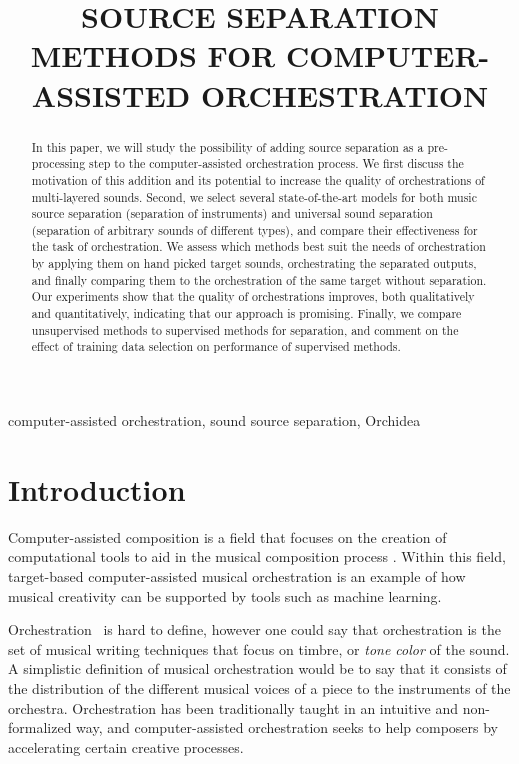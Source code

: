 \documentclass{article}
\title{SOURCE SEPARATION METHODS FOR COMPUTER-ASSISTED ORCHESTRATION}
\begin{document}

\maketitle

\begin{abstract}
  In this paper, we will study the possibility of adding source separation as a pre-processing step to the computer-assisted orchestration process. We first discuss the motivation of this addition and its potential to increase the quality of orchestrations of multi-layered sounds. Second, we select several state-of-the-art models for both music source separation (separation of instruments) and universal sound separation (separation of arbitrary sounds of different types), and compare their effectiveness for the task of orchestration. We assess which methods best suit the needs of orchestration by applying them on hand picked target sounds, orchestrating the separated outputs, and finally comparing them to the orchestration of the same target without separation. Our experiments show that the quality of orchestrations improves, both qualitatively and quantitatively, indicating that our approach is promising. Finally, we compare unsupervised methods to supervised methods for separation, and comment on the effect of training data selection on performance of supervised methods.
\end{abstract}
%
\begin{keywords}
computer-assisted orchestration, sound source separation, Orchidea
\end{keywords}
%
\section{Introduction}\label{sec:introduction}
  Computer-assisted composition is a field that focuses on the creation of computational tools to aid in the musical composition process \cite{FerVic2013, Ari2005}. Within this field, target-based computer-assisted musical orchestration is an example of how musical creativity can be supported by tools such as machine learning.
  
	Orchestration~\cite{Adler2016} is hard to define, however one could say that orchestration is the set of musical writing techniques that focus on timbre, or \textit{tone color} of the sound. A simplistic  definition of musical orchestration would be to say that it consists of the distribution of the different musical voices of a piece to the instruments of the orchestra. Orchestration has been traditionally taught in an intuitive and non-formalized way, and computer-assisted orchestration seeks to help composers by accelerating certain creative processes.
	
\end{document}
